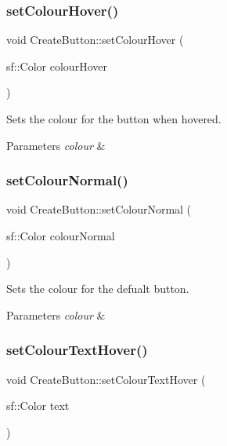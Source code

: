 \subsubsection{\texorpdfstring{set\+Colour\+Hover()}{setColourHover()}}
{\footnotesize\ttfamily void Create\+Button\+::set\+Colour\+Hover (\begin{DoxyParamCaption}\item[{sf\+::\+Color}]{colour\+Hover }\end{DoxyParamCaption})}



Sets the colour for the button when hovered. 


\begin{DoxyParams}{Parameters}
{\em colour} & \\
\hline
\end{DoxyParams}
\mbox{\label{class_create_button_a0f12c11a6a51c2cb2771acc1e85df3e5}} 
\subsubsection{\texorpdfstring{set\+Colour\+Normal()}{setColourNormal()}}
{\footnotesize\ttfamily void Create\+Button\+::set\+Colour\+Normal (\begin{DoxyParamCaption}\item[{sf\+::\+Color}]{colour\+Normal }\end{DoxyParamCaption})}



Sets the colour for the defualt button. 


\begin{DoxyParams}{Parameters}
{\em colour} & \\
\hline
\end{DoxyParams}
\mbox{\label{class_create_button_a6249d944f8b4593dae454449adf9cb0a}} 
\subsubsection{\texorpdfstring{set\+Colour\+Text\+Hover()}{setColourTextHover()}}
{\footnotesize\ttfamily void Create\+Button\+::set\+Colour\+Text\+Hover (\begin{DoxyParamCaption}\item[{sf\+::\+Color}]{text }\end{DoxyParamCaption})}




